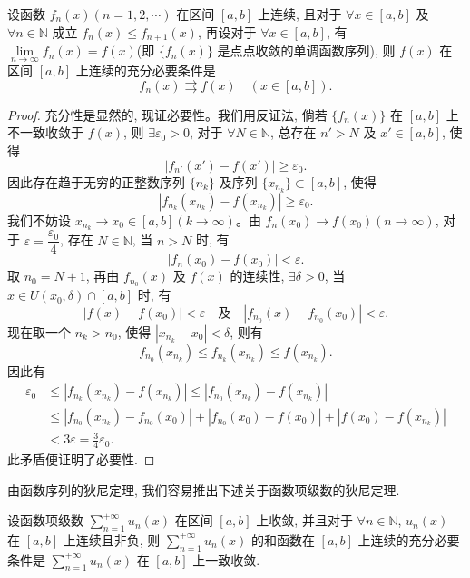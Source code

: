 \begin{theorem}[{狄尼(Dini)定理}]\label{theorem:ma-10-4-2}
设函数 $f_n(x)(n=1,2,\cdots)$ 在区间 $[a,b]$ 上连续, 且对于 $\forall x\in[a,b]$ 及 $\forall n\in\mathbb N$ 成立 $f_n(x)\leq f_{n+1}(x)$, 再设对于 $\forall x\in[a,b]$, 有 $\lim\limits_{n\to\infty}f_n(x)=f(x)$(即 $\{f_n(x)\}$ 是点点收敛的单调函数序列), 则 $f(x)$ 在区间 $[a,b]$ 上连续的充分必要条件是
\[
  f_n(x)\rightrightarrows f(x)\quad(x\in[a,b]).
\]
\end{theorem}


\begin{proof}
充分性是显然的, 现证必要性。我们用反证法, 倘若 $\{f_n(x)\}$ 在 $[a,b]$ 上不一致收敛于 $f(x)$, 则 $\exists\varepsilon_0>0$, 对于 $\forall N\in\mathbb N$, 总存在 $n'>N$ 及 $x'\in[a,b]$, 使得
\[
  |f_{n'}(x')-f(x')|\geq\varepsilon_0.
\]
因此存在趋于无穷的正整数序列 $\{n_k\}$ 及序列 $\{x_{n_k}\}\subset[a,b]$, 使得
\[
  |f_{n_k}(x_{n_k})-f(x_{n_k})|\geq\varepsilon_0.
\]
我们不妨设 $x_{n_k}\to x_0\in[a,b](k\to\infty)$。由 $f_n(x_0)\to f(x_0)(n\to\infty)$, 对于 $\varepsilon=\dfrac{\varepsilon_0}{4}$, 存在 $N\in\mathbb N$, 当 $n>N$ 时, 有
\[
  |f_n(x_0)-f(x_0)|<\varepsilon.
\]
取 $n_0=N+1$, 再由 $f_{n_0}(x)$ 及 $f(x)$ 的连续性, $\exists\delta>0$, 当 $x\in U(x_0,\delta)\cap[a,b]$ 时, 有
\[
  |f(x)-f(x_0)|<\varepsilon\quad\text{及}\quad |f_{n_0}(x)-f_{n_0}(x_0)|<\varepsilon.
\]
现在取一个 $n_k>n_0$, 使得 $|x_{n_k}-x_0|<\delta$, 则有
\[
  f_{n_0}(x_{n_k})\leq f_{n_k}(x_{n_k})\leq f(x_{n_k}).
\]
因此有
\[
\begin{aligned}
  \varepsilon_0
  &\leq |f_{n_k}(x_{n_k})-f(x_{n_k})|
  \leq |f_{n_0}(x_{n_k})-f(x_{n_k})|\\
  &\leq |f_{n_0}(x_{n_k})-f_{n_0}(x_0)|+|f_{n_0}(x_0)-f(x_0)|+|f(x_0)-f(x_{n_k})|\\
  &<3\varepsilon=\frac34\varepsilon_0.
\end{aligned}
\]
此矛盾便证明了必要性.
\end{proof}


由函数序列的狄尼定理, 我们容易推出下述关于函数项级数的狄尼定理.

\begin{theorem}[{狄尼定理}]\label{theorem:ma-10-4-2-prime}
设函数项级数 $\sum\limits_{n=1}^{+\infty}u_n(x)$ 在区间 $[a,b]$ 上收敛, 并且对于 $\forall n\in\mathbb N$, $u_n(x)$ 在 $[a,b]$ 上连续且非负, 则 $\sum\limits_{n=1}^{+\infty}u_n(x)$ 的和函数在 $[a,b]$ 上连续的充分必要条件是 $\sum\limits_{n=1}^{+\infty}u_n(x)$ 在 $[a,b]$ 上一致收敛.
\end{theorem}


